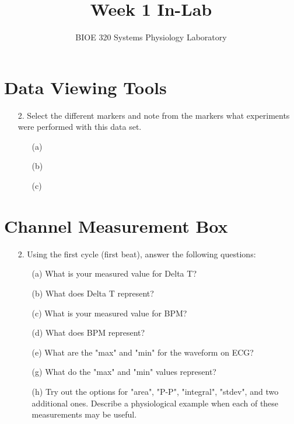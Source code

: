 \documentclass{article}
\title{Week 1 In-Lab}
\author{BIOE 320 Systems Physiology Laboratory}
\date{}
\begin{document}
\maketitle
\large

\section*{Data Viewing Tools}
\begin{itemize}
	\item[2.] Select the different markers and note from the markers what experiments were performed with this data set.
	
		\begin{itemize}
			\item[(a)]
			
			\item[(b)]\vspace{1cm}
			
			\item[(c)]\vspace{1cm}
		\end{itemize}

\end{itemize}

\section*{Channel Measurement Box}
\begin{itemize}		
	\item[2.] Using the first cycle (first beat), answer the following questions:
		\begin{itemize}
			\item[(a)] What is your measured value for Delta T?\vspace{1cm}
			\item[(b)] What does Delta T represent?\vspace{1cm}
			\item[(c)] What is your measured value for BPM?\vspace{1cm}
			\item[(d)] What does BPM represent?\vspace{1cm}
			\item[(e)] What are the "max" and "min" for the waveform on ECG?\vspace{1cm}
			\item[(g)] What do the "max" and "min" values represent?\vspace{2cm}
			\item[(h)] Try out the options for "area", "P-P", "integral", "stdev", and two additional ones. Describe a physiological example when each of these measurements may be useful.\vspace{9cm}
		\end{itemize}
\end{itemize}
\end{document}
